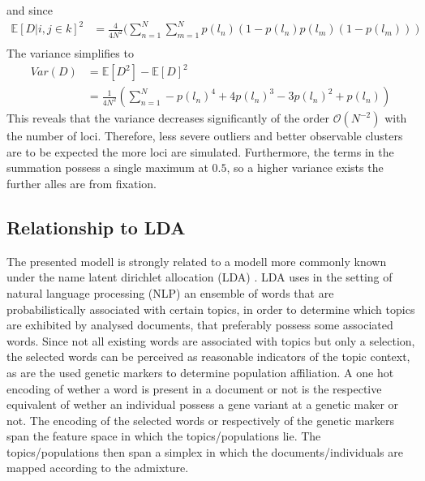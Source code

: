 \documentclass[a4paper, 11pt]{article}
\begin{document}
and since
\begin{align*}
\mathbb{E}[D|i,j \in k]^2 &= \frac{4}{4N^2}( \sum^{N}_{n = 1}\sum^{N}_{m = 1} p(l_n)(1-p(l_n)p(l_m)(1-p(l_m)))\\
\end{align*}
The variance simplifies to
\begin{align*}
Var(D) &= \mathbb{E}[D^2] - \mathbb{E}[D]^2\\
&= \frac{1}{4N^2} (\sum^{N}_{n = 1} -p(l_n)^4+4p(l_n)^3-3p(l_n)^2+p(l_n))
\end{align*}
This reveals that the variance decreases significantly of the order $\mathcal{O}(N^{-2})$ with the number of loci. Therefore, less severe outliers and better observable clusters are to be expected the more loci are simulated. Furthermore, the terms in the summation possess a single maximum at $0.5$, so a higher variance exists the further alles are from fixation.

\subsection{Relationship to LDA}
The presented modell is strongly related to a modell more commonly known under the name latent dirichlet allocation (LDA) \cite{blei2003latent}. LDA uses in the setting of natural language processing (NLP) an ensemble of words that are probabilistically associated with certain topics, in order to determine which topics are exhibited by analysed documents, that preferably possess some associated words. Since not all existing words are associated with topics but only a selection, the selected words can be perceived as reasonable indicators of the topic context, as are the used genetic markers to determine population affiliation. A one hot encoding of wether a word is present in a document or not is the respective equivalent of wether an individual possess a gene variant at a genetic maker or not. The encoding of the selected words or respectively of the genetic markers span the feature space in which the topics/populations lie. The topics/populations then span a simplex in which the documents/individuals are mapped according to the admixture. \\

\end{document}
